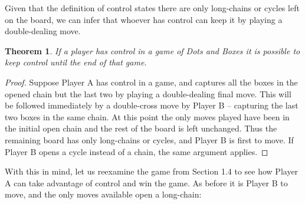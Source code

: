 \documentclass[12pt,twoside]{reedthesis}
\newtheorem{theorem}{Theorem}
\begin{document}
Given that the definition of control states there are only long-chains or cycles left on the board, we can infer that whoever has control can keep it by playing a double-dealing move.

\begin{theorem}
If a player has control in a game of Dots and Boxes it is possible to keep control until the end of that game. 
\end{theorem}

\begin{proof}
Suppose Player A has control in a game, and captures all the boxes in the opened chain but the last two by playing a double-dealing final move.  This will be followed immediately by a double-cross move by Player B -- capturing the last two boxes in the same chain.  At this point the only moves played have been in the initial open chain and the rest of the board is left unchanged.  Thus the remaining board has only long-chains or cycles, and Player B is first to move.  If Player B opens a cycle instead of a chain, the same argument applies.
\end{proof}

With this in mind, let us reexamine the game from Section 1.4 to see how Player A can take advantage of control and win the game.  As before it is Player B to move, and the only moves available open a long-chain:
\end{document}
